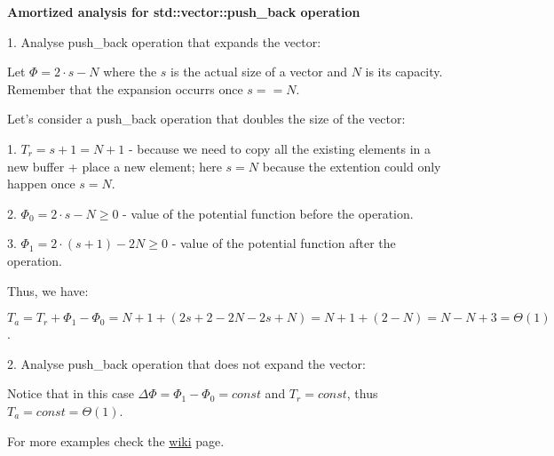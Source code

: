 \begin{example}
    \textbf{Amortized analysis for std::vector::push\_back operation}

    1. Analyse push\_back operation that expands the vector:

    Let $\Phi = 2 \cdot s - N$ where the $s$ is the actual size of a vector and $N$ is its capacity. Remember that the expansion occurrs once $s == N$.

    Let's consider a push\_back operation that doubles the size of the vector:

    1. $T_{r} = s+1 = N+1$ - because we need to copy all the existing elements in a new buffer + place a new element; here $s=N$ because the extention could only happen once $s=N$.

    2. $\Phi_0 = 2\cdot s - N \geq 0$ - value of the potential function before the operation.

    3. $\Phi_1 = 2\cdot (s + 1) - 2N \geq 0$ - value of the potential function after the operation.

    Thus, we have:

    $T_a = T_r + \Phi_1 - \Phi_0 = N+1 + (2s + 2 - 2N - 2s + N) = N+1 + (2-N) = N-N+3 = \Theta(1)$.\newline


    2. Analyse push\_back operation that does not expand the vector:

    Notice that in this case $\Delta\Phi = \Phi_1 - \Phi_0 = const$ and $T_r = const$, thus $T_a = const = \Theta(1)$.\newline

    For more examples check the \href{https://en.wikipedia.org/wiki/Potential_method#Multi-Pop_Stack}{wiki} page.


\end{example}